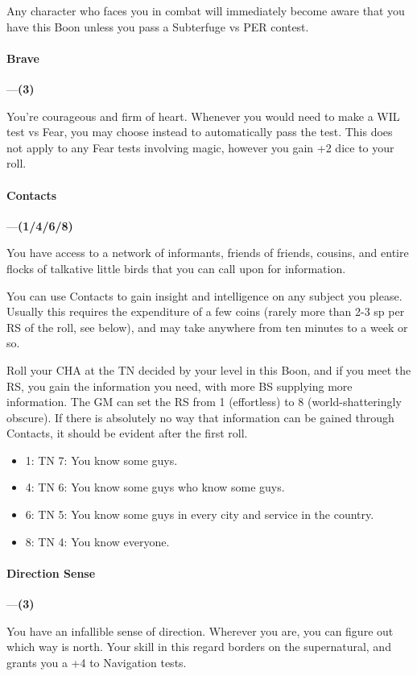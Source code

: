\documentclass[oneside,11pt,english]{book}
\begin{document}
Any character who faces you in combat will immediately become aware that you have this Boon unless you pass a Subterfuge vs PER contest. 
\paragraph{\label{boon:Brave}Brave}---\quad\textbf{(3)}\par
You're courageous and firm of heart. Whenever you would need to make a WIL test vs Fear, you may 
choose instead to automatically pass the test. This does not apply to any Fear tests involving magic, however you gain +2 dice to your roll.
\paragraph{\label{boon:Contacts}Contacts}---\quad\textbf{(1/4/6/8)}\par
You have access to a network of informants, friends of friends, cousins, and entire flocks of talkative little birds that you can call upon for information.


You can use Contacts to gain insight and intelligence on any subject you please. Usually this requires the expenditure of a few coins (rarely more than 2-3 sp per RS of the roll, see below), and may take anywhere from ten minutes to a week or so. 


Roll your CHA at the TN decided by your level in this Boon, and if you meet the RS, you gain the 
information you need, with more BS supplying more information. The GM can set the RS from 1 
(effortless) to 8 (world-shatteringly obscure). If there is absolutely no way that information can be gained 
through Contacts, it should be evident after the first roll. 

\begin{itemize}
\item 1: TN 7: You know some guys. 
\item 4: TN 6: You know some guys who know some guys. 
\item 6: TN 5: You know some guys in every city and service in the country.
\item 8: TN 4: You know everyone.
\end{itemize}
\paragraph{\label{boon:Direction Sense}Direction Sense}---\quad\textbf{(3)}\par
You have an infallible sense of direction. Wherever you are, you can figure out which way is north. Your skill in this regard borders on the supernatural, and grants you a +4 to Navigation tests.
\end{document}
